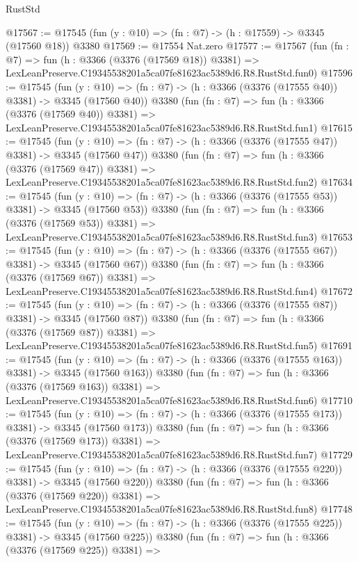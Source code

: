 \begin{lexlean}{RustStd}
\begin{coremodule}
@17567 := @17545 (fun (y : @10) => (fn : @7) -> (h : @17559) -> @3345 (@17560 @18)) @3380
@17569 := @17554 Nat.zero
@17577 := @17567
    (fun (fn : @7) =>
    fun (h : @3366 (@3376 (@17569 @18)) @3381) =>
    LexLeanPreserve.C19345538201a5ca07fe81623ac5389d6.R8.RustStd.fun0)
@17596 := @17545
    (fun (y : @10) => (fn : @7) -> (h : @3366 (@3376 (@17555 @40)) @3381) -> @3345 (@17560 @40))
    @3380
    (fun (fn : @7) =>
    fun (h : @3366 (@3376 (@17569 @40)) @3381) =>
    LexLeanPreserve.C19345538201a5ca07fe81623ac5389d6.R8.RustStd.fun1)
@17615 := @17545
    (fun (y : @10) => (fn : @7) -> (h : @3366 (@3376 (@17555 @47)) @3381) -> @3345 (@17560 @47))
    @3380
    (fun (fn : @7) =>
    fun (h : @3366 (@3376 (@17569 @47)) @3381) =>
    LexLeanPreserve.C19345538201a5ca07fe81623ac5389d6.R8.RustStd.fun2)
@17634 := @17545
    (fun (y : @10) => (fn : @7) -> (h : @3366 (@3376 (@17555 @53)) @3381) -> @3345 (@17560 @53))
    @3380
    (fun (fn : @7) =>
    fun (h : @3366 (@3376 (@17569 @53)) @3381) =>
    LexLeanPreserve.C19345538201a5ca07fe81623ac5389d6.R8.RustStd.fun3)
@17653 := @17545
    (fun (y : @10) => (fn : @7) -> (h : @3366 (@3376 (@17555 @67)) @3381) -> @3345 (@17560 @67))
    @3380
    (fun (fn : @7) =>
    fun (h : @3366 (@3376 (@17569 @67)) @3381) =>
    LexLeanPreserve.C19345538201a5ca07fe81623ac5389d6.R8.RustStd.fun4)
@17672 := @17545
    (fun (y : @10) => (fn : @7) -> (h : @3366 (@3376 (@17555 @87)) @3381) -> @3345 (@17560 @87))
    @3380
    (fun (fn : @7) =>
    fun (h : @3366 (@3376 (@17569 @87)) @3381) =>
    LexLeanPreserve.C19345538201a5ca07fe81623ac5389d6.R8.RustStd.fun5)
@17691 := @17545
    (fun (y : @10) => (fn : @7) -> (h : @3366 (@3376 (@17555 @163)) @3381) -> @3345 (@17560 @163))
    @3380
    (fun (fn : @7) =>
    fun (h : @3366 (@3376 (@17569 @163)) @3381) =>
    LexLeanPreserve.C19345538201a5ca07fe81623ac5389d6.R8.RustStd.fun6)
@17710 := @17545
    (fun (y : @10) => (fn : @7) -> (h : @3366 (@3376 (@17555 @173)) @3381) -> @3345 (@17560 @173))
    @3380
    (fun (fn : @7) =>
    fun (h : @3366 (@3376 (@17569 @173)) @3381) =>
    LexLeanPreserve.C19345538201a5ca07fe81623ac5389d6.R8.RustStd.fun7)
@17729 := @17545
    (fun (y : @10) => (fn : @7) -> (h : @3366 (@3376 (@17555 @220)) @3381) -> @3345 (@17560 @220))
    @3380
    (fun (fn : @7) =>
    fun (h : @3366 (@3376 (@17569 @220)) @3381) =>
    LexLeanPreserve.C19345538201a5ca07fe81623ac5389d6.R8.RustStd.fun8)
@17748 := @17545
    (fun (y : @10) => (fn : @7) -> (h : @3366 (@3376 (@17555 @225)) @3381) -> @3345 (@17560 @225))
    @3380
    (fun (fn : @7) =>
    fun (h : @3366 (@3376 (@17569 @225)) @3381) =>

\end{coremodule}
\end{lexlean}
